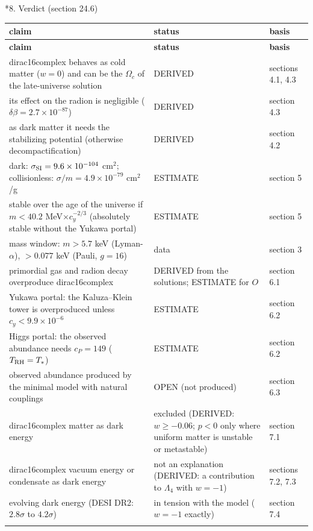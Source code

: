 \documentclass[10pt,a4paper]{article}
\makeatletter
\renewcommand\section{\@startsection{section}{1}{\z@}{-3.5ex \@plus -1ex \@minus -.2ex}{2.3ex \@plus.2ex}{\normalfont\Large\bfseries\raggedright}}
\makeatother
\begin{document}
\section*{8. Verdict (section 24.6)}
{\footnotesize
\begin{longtable}{>{\raggedright\arraybackslash}p{}>{\raggedright\arraybackslash}p{}>{\raggedright\arraybackslash}p{}}
\toprule
\textbf{claim} & \textbf{status} & \textbf{basis} \\
\midrule\endfirsthead
\toprule
\textbf{claim} & \textbf{status} & \textbf{basis} \\
\midrule\endhead
\endfoot
\bottomrule\endlastfoot
dirac16complex behaves as cold matter ($w=0$) and can be the $\Omega_c$ of the late-universe solution & DERIVED & sections 4.1, 4.3 \\
its effect on the radion is negligible ($\delta\beta=2.7\times10^{-87}$) & DERIVED & section 4.3 \\
as dark matter it needs the stabilizing potential (otherwise decompactification) & DERIVED & section 4.2 \\
dark: $\sigma_{\rm SI}=9.6\times10^{-104}$ cm$^2$; collisionless: $\sigma/m=4.9\times10^{-79}$ cm$^2$/g & ESTIMATE & section 5 \\
stable over the age of the universe if $m<40.2$ MeV$\times c_y^{-2/3}$ (absolutely stable without the Yukawa portal) & ESTIMATE & section 5 \\
mass window: $m>5.7$ keV (Lyman-$\alpha$), $>0.077$ keV (Pauli, $g=16$) & data & section 3 \\
primordial gas and radion decay overproduce dirac16complex & DERIVED from the solutions; ESTIMATE for $O$ & section 6.1 \\
Yukawa portal: the Kaluza–Klein tower is overproduced unless $c_y<9.9\times10^{-6}$ & ESTIMATE & section 6.2 \\
Higgs portal: the observed abundance needs $c_P=149$ ($T_{\rm RH}=T_*$) & ESTIMATE & section 6.2 \\
observed abundance produced by the minimal model with natural couplings & OPEN (not produced) & section 6.3 \\
dirac16complex matter as dark energy & excluded (DERIVED: $w\ge-0.06$; $p<0$ only where uniform matter is unstable or metastable) & section 7.1 \\
dirac16complex vacuum energy or condensate as dark energy & not an explanation (DERIVED: a contribution to $\Lambda_4$ with $w=-1$) & sections 7.2, 7.3 \\
evolving dark energy (DESI DR2: $2.8\sigma$ to $4.2\sigma$) & in tension with the model ($w=-1$ exactly) & section 7.4 \\*
\end{longtable}}
\end{document}
